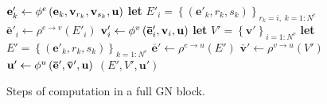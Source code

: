 \begin{algorithm}[t]
\begin{algorithmic}
        \State $\mathbf{e}_k^\prime\gets \phi^e\left(\mathbf{e}_k, \mathbf{v}_{r_k}, \mathbf{v}_{s_k}, \mathbf{u} \right)$
    \EndFor
        \State \textbf{let} $E'_i = \left\{\left(\mathbf{e}'_k, r_k, s_k \right)\right\}_{r_k=i,\; k=1:N^e}$
        \State $\mathbf{\bar{e}}'_i \gets \rho^{e \rightarrow v}\left(E'_i\right)$
        \State $\mathbf{v}'_i \gets \phi^v\left(\mathbf{\bar{e}}'_i, \mathbf{v}_i, \mathbf{u}\right)$
    \EndFor
    \State \textbf{let} $V' = \left\{\mathbf{v}'\right\}_{i=1:N^v}$
    \State \textbf{let} $E' = \left\{\left(\mathbf{e}'_k, r_k, s_k \right)\right\}_{k=1:N^e}$
    \State $\mathbf{\bar{e}}' \gets \rho^{e \rightarrow u}\left(E'\right)$
    \State $\mathbf{\bar{v}}' \gets \rho^{v \rightarrow u}\left(V'\right)$
    \State $\mathbf{u}' \gets \phi^u\left(\mathbf{\bar{e}}', \mathbf{\bar{v}}', \mathbf{u}\right)$
    \State \Return $(E', V', \mathbf{u}')$
\EndFunction
\end{algorithmic}
\caption{Steps of computation in a full GN block.}
\label{alg:gn}
\end{algorithm}

